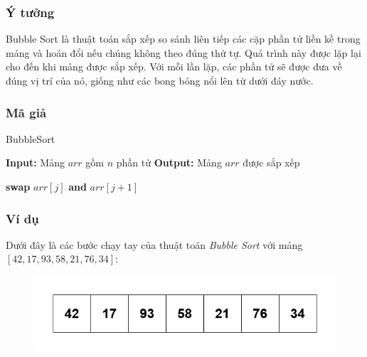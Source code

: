 \subsubsection{Ý tưởng}
Bubble Sort là thuật toán sắp xếp so sánh liên tiếp các cặp phần tử liền kề trong mảng và hoán đổi nếu chúng không theo đúng thứ tự. Quá trình này được lặp lại cho đến khi mảng được sắp xếp. Với mỗi lần lặp, các phần tử sẽ được đưa về đúng vị trí của nó, giống như các bong bóng nổi lên từ dưới đáy nước. \cite{black2009}
\subsubsection{Mã giả}

\begin{algorithm}[H]
\caption{BubbleSort}
\begin{algorithmic}[1]
    \State \textbf{Input:} Mảng $arr$ gồm $n$ phần tử
    \State \textbf{Output:} Mảng $arr$ được sắp xếp
    
                \State \textbf{swap} $arr[j]$ \textbf{and} $arr[j+1]$
            \EndIf
        \EndFor
    \EndFor
\EndProcedure
\end{algorithmic}
\end{algorithm}

\subsubsection{Ví dụ}

Dưới đây là các bước chạy tay của thuật toán \textit{Bubble Sort} với mảng $[42, 17, 93, 58, 21, 76, 34]$:
\begin{figure}[H]
    \centering
    \includegraphics[width=0.75\linewidth]{img/bubble_sort/1.png}
\end{figure}

